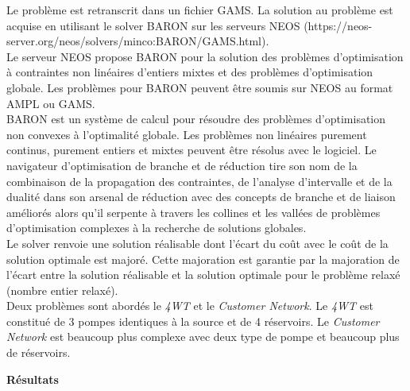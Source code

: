 \documentclass{article}
\begin{document}
\begin{multicols}{2}
    Le problème est retranscrit dans un fichier GAMS. La solution au problème est acquise en utilisant le solver BARON sur les serveurs NEOS (https://neos-server.org/neos/solvers/minco:BARON/GAMS.html).\\
    Le serveur NEOS propose BARON pour la solution des problèmes d'optimisation à contraintes non linéaires d'entiers mixtes et des problèmes d'optimisation globale. Les problèmes pour BARON peuvent être soumis sur NEOS au format AMPL ou GAMS.\\
    BARON est un système de calcul pour résoudre des problèmes d'optimisation non convexes à l'optimalité globale. Les problèmes non linéaires purement continus, purement entiers et mixtes peuvent être résolus avec le logiciel. Le navigateur d'optimisation de branche et de réduction tire son nom de la combinaison de la propagation des contraintes, de l'analyse d'intervalle et de la dualité dans son arsenal de réduction avec des concepts de branche et de liaison améliorés alors qu'il serpente à travers les collines et les vallées de problèmes d'optimisation complexes à la recherche de solutions globales.\\
    Le solver renvoie une solution réalisable dont l'écart
    du coût avec le coût de la solution optimale est majoré. Cette majoration est garantie par la majoration de l'écart entre la solution réalisable et la solution optimale pour le problème relaxé (nombre entier relaxé).\\
    Deux problèmes sont abordés le \textit{4WT} et le \textit{Customer Network}. Le \textit{4WT} est constitué de 3 pompes identiques à la source et de 4 réservoirs. Le \textit{Customer Network} est beaucoup plus complexe avec deux type de pompe et beaucoup plus de réservoirs.
\end{multicols}


\textbf{Résultats}\\
\end{document}
